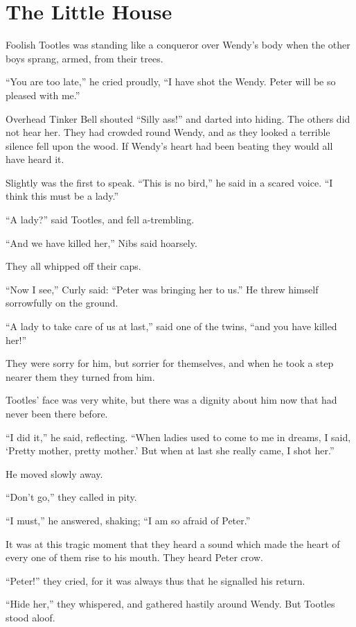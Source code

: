 \chapter{The Little House}

Foolish Tootles was standing like a conqueror over Wendy's body when the other
boys sprang, armed, from their trees.

``You are too late,'' he cried proudly, ``I have shot the Wendy.
Peter will be so pleased with me.''

Overhead Tinker Bell shouted ``Silly ass!'' and darted into hiding.
The others did not hear her.
They had crowded round Wendy, and as they looked a terrible silence fell upon
the wood.
If Wendy's heart had been beating they would all have heard it.

Slightly was the first to speak.
``This is no bird,'' he said in a scared voice.
``I think this must be a lady.''

``A lady?'' said Tootles, and fell a-trembling.

``And we have killed her,'' Nibs said hoarsely.

They all whipped off their caps.

``Now I see,'' Curly said: ``Peter was bringing her to us.''
He threw himself sorrowfully on the ground.

``A lady to take care of us at last,'' said one of the twins, ``and you
have killed her!''

They were sorry for him, but sorrier for themselves, and when he took a step
nearer them they turned from him.

Tootles' face was very white, but there was a dignity about him now that had
never been there before.

``I did it,'' he said, reflecting.
``When ladies used to come to me in dreams, I said, ‘Pretty mother, pretty
mother.'
But when at last she really came, I shot her.''

He moved slowly away.

``Don't go,'' they called in pity.

``I must,'' he answered, shaking; ``I am so afraid of Peter.''

It was at this tragic moment that they heard a sound which made the
heart of every one of them rise to his mouth. They heard Peter crow.

``Peter!'' they cried, for it was always thus that he signalled his return.

``Hide her,'' they whispered, and gathered hastily around Wendy.
But Tootles stood aloof.

